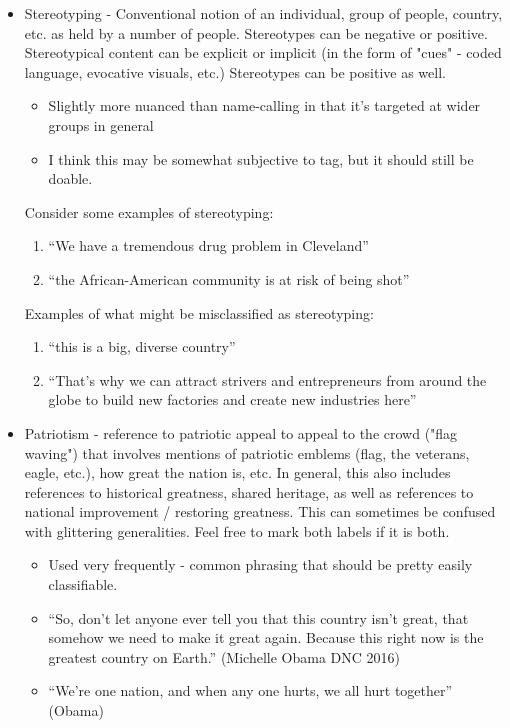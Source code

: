 \documentclass[letterpaper]{article}
\begin{document}
\begin{itemize}
	\item Stereotyping - Conventional notion of an individual, group of people, country, etc. as held by a number of people.  Stereotypes can be negative or positive. Stereotypical content can be explicit or implicit (in the form of "cues" - coded language, evocative visuals, etc.) Stereotypes can be positive as well.
		\begin{itemize}
			\item Slightly more nuanced than name-calling in that it's targeted at wider groups in general
			\item I think this may be somewhat subjective to tag, but it should still be doable.
		\end{itemize}
	Consider some examples of stereotyping: \\
	\begin{enumerate}
		\item ``We have a tremendous drug problem in Cleveland''
		\item ``the African-American community is at risk of being shot''
	\end{enumerate}
	Examples of what might be misclassified as stereotyping: \\
	\begin{enumerate}
		\item ``this is a big, diverse country''
		\item ``That’s why we can attract strivers and entrepreneurs from around the globe to build new factories and create new industries here''
	\end{enumerate}
	\item Patriotism - reference to patriotic appeal to appeal to the crowd ("flag waving") that involves mentions of patriotic emblems (flag, the veterans, eagle, etc.), how great the nation is, etc. In general, this also includes references to historical greatness, shared heritage, as well as references to national improvement / restoring greatness. This can sometimes be confused with glittering generalities. Feel free to mark both labels if it is both.
		\begin{itemize}
			\item Used very frequently - common phrasing that should be pretty easily classifiable.
			\item ``So, don’t let anyone ever tell you that this country isn’t great, that somehow we need to make it great again. Because this right now is the greatest country on Earth.'' (Michelle Obama DNC 2016)
			\item ``We’re one nation, and when any one hurts, we all hurt together'' (Obama)

\end{itemize}
\end{itemize}
\end{document}
